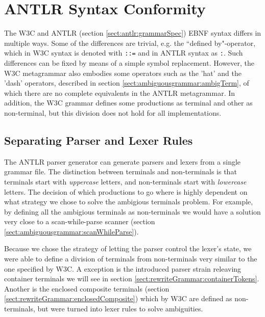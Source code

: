 \section{ANTLR Syntax Conformity}
The W3C\cite{w3c00} and ANTLR (section \ref{sect:antlr:grammarSpec}) EBNF syntax differs in multiple ways. Some of the differences are trivial, e.g. the ``defined by"-operator, which in W3C syntax is denoted with \verb!::=! and in ANTLR syntax as \verb!:!. Such differences can be fixed by means of a simple symbol replacement. However, the W3C metagrammar also embodies some operators such as the 'hat' and the 'dash' operators, described in section \ref{sect:ambiguousgrammar:ambigTerm}, of which there are no complete equivalents in the ANTLR metagrammar. In addition, the W3C grammar defines some productions as terminal and other as non-terminal, but this division does not hold for all implementations.

\subsection{Separating Parser and Lexer Rules}
\label{sect:implementation:separate}
The ANTLR parser generator can generate parsers and lexers from a single
grammar file. The distinction between terminals and non-terminals is that
terminals start with \emph{uppercase} letters, and non-terminals start with
\emph{lowercase} letters. The decision of which productions to go where is highly dependent on what strategy we chose to solve the ambigious terminals problem. For example, by defining all the ambigious terminals as non-terminals we would have a solution very close to a scan-while-parse scanner (section \ref{sect:ambiguousgrammar:scanWhileParse}). 

Because we chose the strategy of letting the parser control the lexer's state, we were able to define a division of terminals from non-terminals very similar to the one specified by W3C. A exception is the introduced parser strain releaving container terminals we will see in section \ref{sect:rewriteGrammar:containerTokens}. Another is the enclosed composite terminals (section \ref{sect:rewriteGrammar:enclosedComposite}) which by W3C are defined as non-terminals, but were turned into lexer rules to solve ambiguities.

